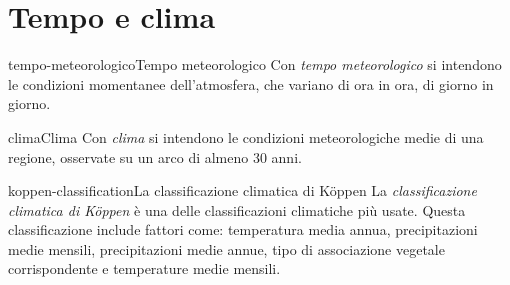 \documentclass[preview]{standalone}
\begin{document}
\genpage

\section{Tempo e clima}

\begin{snippetdefinition}{tempo-meteorologico}{Tempo meteorologico}
    Con \textit{tempo meteorologico}
    si intendono le condizioni momentanee
    dell'atmosfera, che variano di ora
    in ora, di giorno in giorno.
\end{snippetdefinition}

\begin{snippetdefinition}{clima}{Clima}
    Con \textit{clima}
    si intendono le condizioni meteorologiche
    medie di una regione, osservate
    su un arco di almeno 30 anni.
\end{snippetdefinition}

\begin{snippetdefinition}{koppen-classification}{La classificazione climatica di Köppen}
    La \textit{classificazione climatica di Köppen} è una delle classificazioni climatiche più usate.
    Questa classificazione include fattori come: temperatura media annua, precipitazioni medie mensili,
    precipitazioni medie annue, tipo di associazione vegetale corrispondente e temperature medie mensili.
\end{snippetdefinition}
\end{document}
